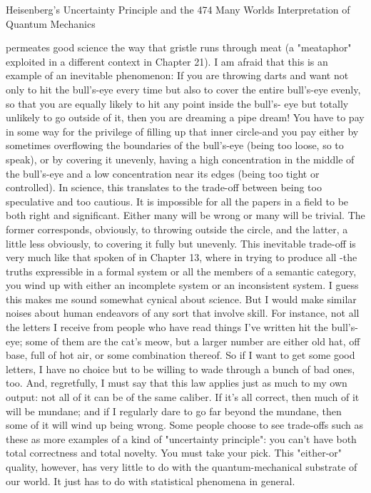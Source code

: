 Heisenberg's Uncertainty Principle and the                                           474
Many Worlds Interpretation of Quantum Mechanics

permeates good science the way that gristle runs through meat (a "meataphor"
exploited in a different context in Chapter 21).
         I am afraid that this is an example of an inevitable phenomenon: If you are
throwing darts and want not only to hit the bull's-eye every time but also to cover the
entire bull's-eye evenly, so that you are equally likely to hit any point inside the bull's-
eye but totally unlikely to go outside of it, then you are dreaming a pipe dream! You
have to pay in some way for the privilege of filling up that inner circle-and you pay
either by sometimes overflowing the boundaries of the bull's-eye (being too loose, so
to speak), or by covering it unevenly, having a high concentration in the middle of the
bull's-eye and a low concentration near its edges (being too tight or controlled). In
science, this translates to the trade-off between being too speculative and too cautious.
It is impossible for all the papers in a field to be both right and significant. Either
many will be wrong or many will be trivial. The former corresponds, obviously, to
throwing outside the circle, and the latter, a little less obviously, to covering it fully
but unevenly. This inevitable trade-off is very much like that spoken of in Chapter 13,
where in trying to produce all -the truths expressible in a formal system or all the
members of a semantic category, you wind up with either an incomplete system or an
inconsistent system.
         I guess this makes me sound somewhat cynical about science. But I would
make similar noises about human endeavors of any sort that involve skill. For
instance, not all the letters I receive from people who have read things I've written hit
the bull's-eye; some of them are the cat's meow, but a larger number are either old hat,
off base, full of hot air, or some combination thereof. So if I want to get some good
letters, I have no choice but to be willing to wade through a bunch of bad ones, too.
And, regretfully, I must say that this law applies just as much to my own output: not
all of it can be of the same caliber. If it's all correct, then much of it will be mundane;
and if I regularly dare to go far beyond the mundane, then some of it will wind up
being wrong.
         Some people choose to see trade-offs such as these as more examples of a kind
of "uncertainty principle": you can't have both total correctness and total novelty. You
must take your pick. This "either-or" quality, however, has very little to do with the
quantum-mechanical substrate of our world. It just has to do with statistical
phenomena in general.

